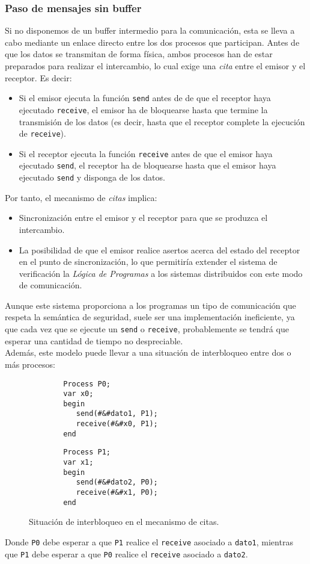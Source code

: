 \subsubsection{Paso de mensajes sin buffer}
Si no disponemos de un buffer intermedio para la comunicación, esta se lleva a cabo mediante un enlace directo entre los dos procesos que participan. Antes de que los datos se transmitan de forma física, ambos procesos han de estar preparados para realizar el intercambio, lo cual exige una \textit{cita} entre el emisor y el receptor. Es decir:
\begin{itemize}
    \item Si el emisor ejecuta la función \verb|send| antes de de que el receptor haya ejecutado \verb|receive|, el emisor ha de bloquearse hasta que termine la transmisión de los datos (es decir, hasta que el receptor complete la ejecución de \verb|receive|).
    \item Si el receptor ejecuta la función \verb|receive| antes de que el emisor haya ejecutado \verb|send|, el receptor ha de bloquearse hasta que el emisor haya ejecutado \verb|send| y disponga de los datos.
\end{itemize}
Por tanto, el mecanismo de \textit{citas} implica:
\begin{itemize}
    \item Sincronización entre el emisor y el receptor para que se produzca el intercambio.
    \item La posibilidad de que el emisor realice asertos acerca del estado del receptor en el punto de sincronización, lo que permitiría extender el sistema de verificación la \textit{Lógica de Programas} a los sistemas distribuidos con este modo de comunicación.
\end{itemize}
Aunque este sistema proporciona a los programas un tipo de comunicación que respeta la semántica de seguridad, suele ser una implementación ineficiente, ya que cada vez que se ejecute un \verb|send| o \verb|receive|, probablemente se tendrá que esperar una cantidad de tiempo no despreciable.\\

Además, este modelo puede llevar a una situación de interbloqueo entre dos o más procesos:
\begin{figure}[H]
    \centering
\setlength{\columnsep}{1cm}
\begin{multicols}{2}
    \begin{verbatim}
        Process P0;
        var x0;
        begin
           send(#&#dato1, P1);
           receive(#&#x0, P1);
        end
    \end{verbatim}
    \begin{verbatim}
        Process P1;
        var x1;
        begin
           send(#&#dato2, P0);
           receive(#&#x1, P0);
        end
    \end{verbatim}
\end{multicols}
\caption{Situación de interbloqueo en el mecanismo de citas.}    
\end{figure}
Donde \verb|P0| debe esperar a que \verb|P1| realice el \verb|receive| asociado a \verb|dato1|, mientras que \verb|P1| debe esperar a que \verb|P0| realice el \verb|receive| asociado a \verb|dato2|.


